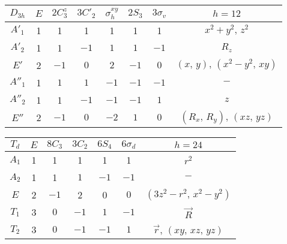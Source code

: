 \begin{center}
\begin{tabular}{ |c|c|c|c|c|c|c|c| }
 \hline
 $D_{3h}$ & $E$ & $2C_3^z$ & $3C'_2$ & $\sigma_h^{xy}$ & $2S_{3}$ & $3\sigma_{v}$ & $h=12$ \\ 
 \hline
 $A'_1$ & 1 & 1 & 1 & 1 & 1 & 1 & $x^2+y^2,\,z^2$ \\  
 \hline
 $A'_{2}$ & 1 & 1 & $-1$ & $1$ & $1$ & $-1$ & $R_z$ \\
 \hline
 $E'$ & 2 & $-1$ & $0$ & $2$ & $-1$ & $0$ & $(x,\,y),\,(x^2-y^2,\,xy)$ \\
 \hline
 $A''_{1}$ & 1 & $1$ & $1$ & $-1$ & $-1$ & $-1$ & $-$ \\
 \hline
 $A''_2$ & 1 & 1 & $-1$ & $-1$ & $-1$ & $1$ &  $z$ \\  
 \hline
 $E''$ & 2 & $-1$ & $0$ & $-2$ & $1$ & $0$ & $(R_x,\,R_y),\,(xz,\,yz)$ \\
 \hline
\end{tabular}
\end{center}

\begin{center}
\begin{tabular}{ |c|c|c|c|c|c|c| }
 \hline
 $T_{d}$ & $E$ & $8C_3$ & $3C_2$ & $6S_4$ & $6\sigma_d$ & $h=24$ \\ 
 \hline
 $A_1$ & 1 & 1 & 1 & 1 & 1 & $r^2$ \\  
 \hline
 $A_2$ & 1 & 1 & $1$ & $-1$ & $-1$ & $-$ \\
 \hline
 $E$ & 2 & $-1$ & 2 & 0 & $0$ & $(3z^2-r^2,\,x^2-y^2)$ \\  
 \hline
 $T_1$ & 3 & $0$ & $-1$ & $1$ & $-1$ & $\vec{R}$ \\
 \hline
 $T_2$ & 3 & $0$ & $-1$ & $-1$ & $1$ & $\vec{r},\,(xy,\,xz,\,yz)$ \\
 \hline
\end{tabular}
\end{center}

